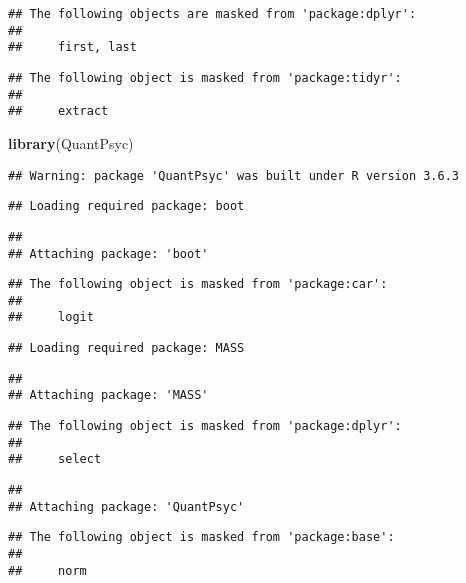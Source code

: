 \documentclass[
]{article}
\newenvironment{Shaded}{\begin{snugshade}}{\end{snugshade}}
\newcommand{\KeywordTok}[1]{\textcolor[rgb]{0.13,0.29,0.53}{\textbf{#1}}}
\newcommand{\NormalTok}[1]{#1}
\begin{document}
\begin{verbatim}
## The following objects are masked from 'package:dplyr':
## 
##     first, last
\end{verbatim}

\begin{verbatim}
## The following object is masked from 'package:tidyr':
## 
##     extract
\end{verbatim}

\begin{Shaded}
\begin{Highlighting}[]
\KeywordTok{library}\NormalTok{(QuantPsyc)}
\end{Highlighting}
\end{Shaded}

\begin{verbatim}
## Warning: package 'QuantPsyc' was built under R version 3.6.3
\end{verbatim}

\begin{verbatim}
## Loading required package: boot
\end{verbatim}

\begin{verbatim}
## 
## Attaching package: 'boot'
\end{verbatim}

\begin{verbatim}
## The following object is masked from 'package:car':
## 
##     logit
\end{verbatim}

\begin{verbatim}
## Loading required package: MASS
\end{verbatim}

\begin{verbatim}
## 
## Attaching package: 'MASS'
\end{verbatim}

\begin{verbatim}
## The following object is masked from 'package:dplyr':
## 
##     select
\end{verbatim}

\begin{verbatim}
## 
## Attaching package: 'QuantPsyc'
\end{verbatim}

\begin{verbatim}
## The following object is masked from 'package:base':
## 
##     norm
\end{verbatim}
\end{document}
